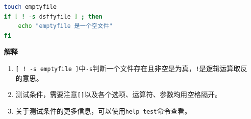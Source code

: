 \documentclass[doctor,openright,twoside]{sjtuthesis}
\providecommand{\tightlist}{%
    \setlength{\itemsep}{0pt}\setlength{\parskip}{0pt}}
\newcommand{\passthrough}[1]{#1}
\theoremstyle{plain}
\theoremstyle{definition}
\theoremstyle{remark}
\theoremstyle{ocrenumbox}
\theoremstyle{plain}
\begin{document}
\begin{lstlisting}[language=bash]
touch emptyfile
if [ ! -s dsffyfile ] ; then
    echo "emptyfile 是一个空文件"
fi
\end{lstlisting}

\textbf{解释}

\begin{enumerate}
\def\labelenumi{\arabic{enumi}.}
\tightlist
\item
  \passthrough{\lstinline"[ ! -s emptyfile ]"}中\passthrough{\lstinline!-s!}判断一个文件存在且非空是为真，\passthrough{\lstinline"!"}是逻辑运算取反的意思。
\item
  测试条件，需要注意\passthrough{\lstinline![]!}以及各个选项、运算符、参数均用空格\passthrough{\lstinline!!}隔开。
\item
  关于测试条件的更多信息，可以使用\passthrough{\lstinline!help test!}命令查看。
\end{enumerate}
\end{document}
